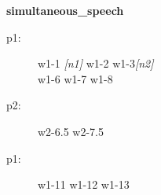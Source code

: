 \documentclass{article}
\newcommand{\turn}[2]{
\item[#1:] #2
}
\begin{document}
\begin{center}\textbf{simultaneous\_speech}\end{center}

\begin{description}

\turn{p1}{w1-1 \textit{[n1]} w1-2 w1-3\textit{[n2]} \\
w1-6 w1-7 w1-8}

\turn{p2}{w2-6.5 w2-7.5}

\turn{p1}{w1-11 w1-12 w1-13}


\end{description}
\end{document}
